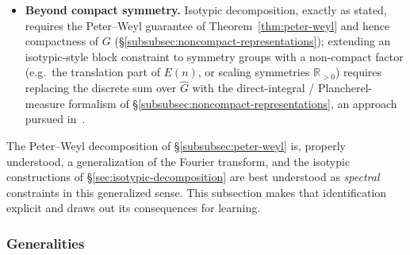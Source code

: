 \documentclass[mathematics,review,submit,moreauthors]{Definitions/mdpi}
\begin{document}
\begin{Example}
\begin{itemize}
    imposing the isotypic block constraint relative to an unconstrained
    network of the same width---is the subject of the universal
    approximation analysis in~\cite{yarotsky2018r}.
    \item \textbf{Beyond compact symmetry.} Isotypic decomposition, exactly
    as stated, requires the Peter--Weyl guarantee of
    Theorem~\ref{thm:peter-weyl} and hence compactness of $G$
    (\S\ref{subsubsec:noncompact-representations}); extending an isotypic-style
    block constraint to symmetry groups with a non-compact factor (e.g.\ the
    translation part of $E(n)$, or scaling symmetries
    $\mathbb{R}_{>0}$) requires replacing the discrete sum over
    $\widehat{G}$ with the direct-integral / Plancherel-measure formalism
    of \S\ref{subsubsec:noncompact-representations}, an approach pursued
    in~\cite{gibson2024}.
\end{itemize}
\end{Example}

\label{subsec:harmonic-analysis}

The Peter--Weyl decomposition of \S\ref{subsubsec:peter-weyl} is, properly
understood, a generalization of the Fourier transform, and the isotypic
constructions of \S\ref{sec:isotypic-decomposition} are best understood
as \emph{spectral} constraints in this generalized sense. This subsection
makes that identification explicit and draws out its consequences for
learning.

\subsubsection{Generalities}
\label{subsubsec:harmonic-analysis-generalities}
\end{document}
